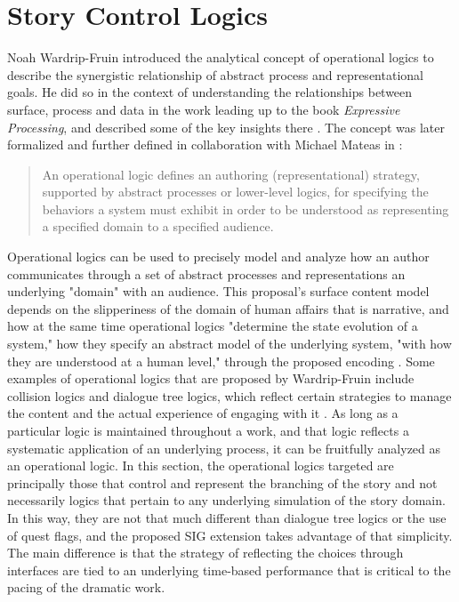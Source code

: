 \section{Story Control Logics}
\label{sec:orgheadline6}
Noah Wardrip-Fruin introduced the analytical concept of operational
logics \cite{Wardrip-fruin} to describe the synergistic relationship
of abstract process and representational goals. He did so in the
context of understanding the relationships between surface, process
and data in the work leading up to the book \emph{Expressive Processing},
and described some of the key insights there \cite{Wardrip-Fruin2009}.
The concept was later formalized and further defined in collaboration
with Michael Mateas in \cite{Mateas2009b}:

\begin{quote}
An operational logic defines an authoring (representational)
strategy, supported by abstract processes or lower-level logics, for
specifying the behaviors a system must exhibit in order to be
understood as representing a specified domain to a specified
audience. \cite{Mateas2009b}
\end{quote}

Operational logics can be used to precisely model and analyze how an
author communicates through a set of abstract processes and
representations an underlying "domain" with an audience. This
proposal's surface content model depends on the slipperiness of the
domain of human affairs that is narrative, and how at the same time
operational logics "determine the state evolution of a system," how
they specify an abstract model of the underlying system, "with how
they are understood at a human level," through the proposed encoding
\cite{Mateas2009b}. Some examples of operational logics that are
proposed by Wardrip-Fruin include collision logics and dialogue tree
logics, which reflect certain strategies to manage the content and the
actual experience of engaging with it \cite{Wardrip-Fruin2009}. As
long as a particular logic is maintained throughout a work, and that
logic reflects a systematic application of an underlying process, it
can be fruitfully analyzed as an operational logic. In this section,
the operational logics targeted are principally those that control and
represent the branching of the story and not necessarily logics that
pertain to any underlying simulation of the story domain. In this way,
they are not that much different than dialogue tree logics or the use
of quest flags, and the proposed SIG extension takes advantage of that
simplicity. The main difference is that the strategy of reflecting the
choices through interfaces are tied to an underlying time-based
performance that is critical to the pacing of the dramatic work.

